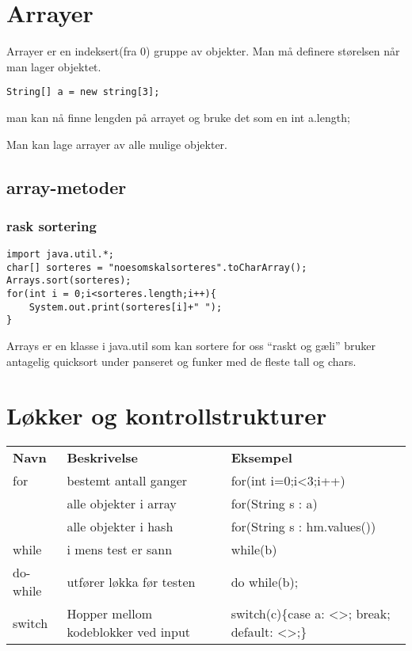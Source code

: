 \documentclass[11pt]{article}
\begin{document}
\section{Arrayer}
\label{sec-4}


  Arrayer er en indeksert(fra 0) gruppe av objekter. Man må definere
  størelsen når man lager objektet.

\begin{verbatim}
String[] a = new string[3];
\end{verbatim}
  man kan nå finne lengden på arrayet og bruke det som en int a.length;

  Man kan lage arrayer av alle mulige objekter.
\subsection{array-metoder}
\label{sec-4-1}
\subsubsection{rask sortering}
\label{sec-4-1-1}


\begin{verbatim}
import java.util.*;
char[] sorteres = "noesomskalsorteres".toCharArray();
Arrays.sort(sorteres);
for(int i = 0;i<sorteres.length;i++){
    System.out.print(sorteres[i]+" ");
}
\end{verbatim}

Arrays er en klasse i java.util som kan sortere for oss ``raskt og gæli''
bruker antagelig quicksort under panseret og funker med de fleste tall og 
chars.
\section{Løkker og kontrollstrukturer}
\label{sec-5}



\begin{center}
\begin{tabular}{lll}
 \textbf{Navn}  &  \textbf{Beskrivelse}                 &  \textbf{Eksempel}                             \\
 for            &  bestemt antall ganger                &  for(int i=0;i<3;i++){ }                       \\
                &  alle objekter i array                &  for(String s : a){ }                          \\
                &  alle objekter i hash                 &  for(String s : hm.values())                   \\
 while          &  i mens test er sann                  &  while(b){ }                                   \\
 do-while       &  utfører løkka før testen             &  do { } while(b);                              \\
 switch         &  Hopper mellom kodeblokker ved input  &  switch(c)\{case a: <>; break; default: <>;\}  \\
\end{tabular}
\end{center}
\end{document}
